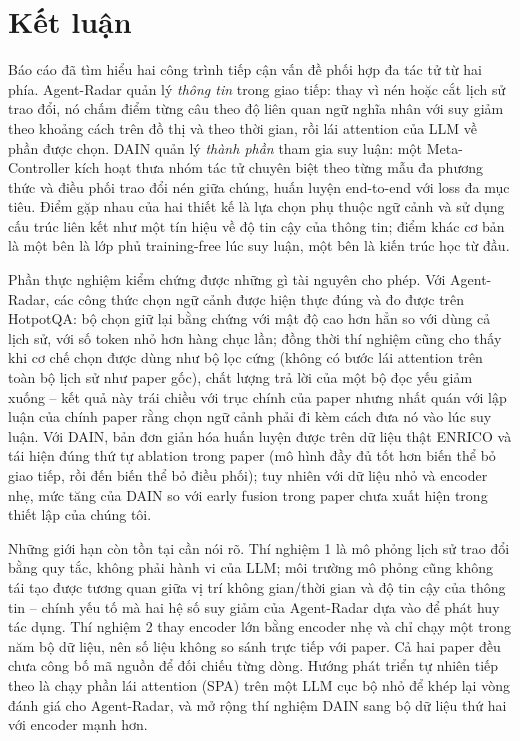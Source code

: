 \section{Kết luận}\label{sec:conclusion}

Báo cáo đã tìm hiểu hai công trình tiếp cận vấn đề phối hợp đa tác tử từ hai phía. Agent-Radar quản lý \emph{thông tin} trong giao tiếp: thay vì nén hoặc cắt lịch sử trao đổi, nó chấm điểm từng câu theo độ liên quan ngữ nghĩa nhân với suy giảm theo khoảng cách trên đồ thị và theo thời gian, rồi lái attention của LLM về phần được chọn. DAIN quản lý \emph{thành phần} tham gia suy luận: một Meta-Controller kích hoạt thưa nhóm tác tử chuyên biệt theo từng mẫu đa phương thức và điều phối trao đổi nén giữa chúng, huấn luyện end-to-end với loss đa mục tiêu. Điểm gặp nhau của hai thiết kế là lựa chọn phụ thuộc ngữ cảnh và sử dụng cấu trúc liên kết như một tín hiệu về độ tin cậy của thông tin; điểm khác cơ bản là một bên là lớp phủ training-free lúc suy luận, một bên là kiến trúc học từ đầu.

Phần thực nghiệm kiểm chứng được những gì tài nguyên cho phép. Với Agent-Radar, các công thức chọn ngữ cảnh được hiện thực đúng và đo được trên HotpotQA: bộ chọn giữ lại bằng chứng với mật độ cao hơn hẳn so với dùng cả lịch sử, với số token nhỏ hơn hàng chục lần; đồng thời thí nghiệm cũng cho thấy khi cơ chế chọn được dùng như bộ lọc cứng (không có bước lái attention trên toàn bộ lịch sử như paper gốc), chất lượng trả lời của một bộ đọc yếu giảm xuống -- kết quả này trái chiều với trục chính của paper nhưng nhất quán với lập luận của chính paper rằng chọn ngữ cảnh phải đi kèm cách đưa nó vào lúc suy luận. Với DAIN, bản đơn giản hóa huấn luyện được trên dữ liệu thật ENRICO và tái hiện đúng thứ tự ablation trong paper (mô hình đầy đủ tốt hơn biến thể bỏ giao tiếp, rồi đến biến thể bỏ điều phối); tuy nhiên với dữ liệu nhỏ và encoder nhẹ, mức tăng của DAIN so với early fusion trong paper chưa xuất hiện trong thiết lập của chúng tôi.

Những giới hạn còn tồn tại cần nói rõ. Thí nghiệm 1 là mô phỏng lịch sử trao đổi bằng quy tắc, không phải hành vi của LLM; môi trường mô phỏng cũng không tái tạo được tương quan giữa vị trí không gian/thời gian và độ tin cậy của thông tin -- chính yếu tố mà hai hệ số suy giảm của Agent-Radar dựa vào để phát huy tác dụng. Thí nghiệm 2 thay encoder lớn bằng encoder nhẹ và chỉ chạy một trong năm bộ dữ liệu, nên số liệu không so sánh trực tiếp với paper. Cả hai paper đều chưa công bố mã nguồn để đối chiếu từng dòng. Hướng phát triển tự nhiên tiếp theo là chạy phần lái attention (SPA) trên một LLM cục bộ nhỏ để khép lại vòng đánh giá cho Agent-Radar, và mở rộng thí nghiệm DAIN sang bộ dữ liệu thứ hai với encoder mạnh hơn.
